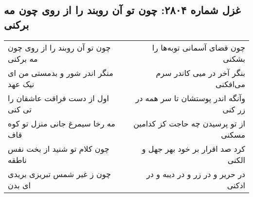 \begin{center}
\section*{غزل شماره ۲۸۰۴: چون تو آن روبند را از روی چون مه برکنی}
\label{sec:2804}
\begin{longtable}{l p{0.5cm} r}
چون تو آن روبند را از روی چون مه برکنی
&&
چون قضای آسمانی توبه‌ها را بشکنی
\\
منگر اندر شور و بدمستی من ای نیک عهد
&&
بنگر آخر در میی کاندر سرم می‌افکنی
\\
اول از دست فراقت عاشقان را تی کنی
&&
وآنگه اندر پوستشان تا سر همه در زر کنی
\\
مه رخا سیمرغ جانی منزل تو کوه قاف
&&
از تو پرسیدن چه حاجت کز کدامین مسکنی
\\
چون کلام تو شنید از بخت نفس ناطقه
&&
کرد صد اقرار بر خود بهر جهل و الکنی
\\
چون ز غیر شمس تبریزی بریدی ای بدن
&&
در حریر و در زر و در دیبه و در ادکنی
\\
\end{longtable}
\end{center}

